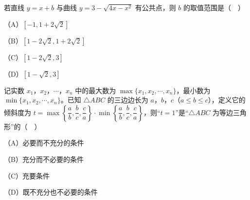 \begin{question}
若直线 $y=x+b$ 与曲线 $y=3-\sqrt{4x-x^2}$ 有公共点，则 $b$ 的取值范围是（　）

（A）$[-1,1+2\sqrt2]$

（B）$[1-2\sqrt2,1+2\sqrt2]$

（C）$[1-2\sqrt2,3]$

（D）$[1-\sqrt2,3]$

\end{question}
\begin{question}
记实数 $x_1$，$x_2$，$\cdots$，$x_n$ 中的最大数为 $\max\{x_1,x_2,\cdots,x_n\}$，最小数为 $\min\{x_1,x_2,\cdots,x_n\}$。已知 $\triangle ABC$ 的三边边长为 $a$，$b$，$c$（$a\leqslant b\leqslant c$），定义它的倾斜度为 $t=\max\left\{\dfrac ab,\dfrac bc,\dfrac ca\right\}\cdot\min\left\{\dfrac ab,\dfrac bc,\dfrac ca\right\}$，则“$t=1$”是“$\triangle ABC$ 为等边三角形”的（　）

（A）必要而不充分的条件

（B）充分而不必要的条件

（C）充要条件

（D）既不充分也不必要的条件

\end{question}

